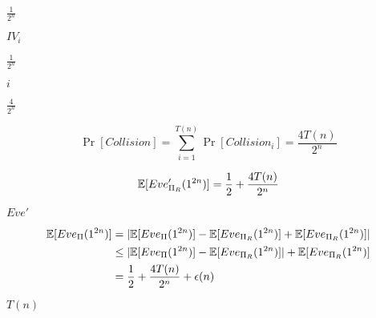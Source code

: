 \documentclass[10pt]{book}
\begin{document}
\begin{mdSnippets}
\begin{mdInlineSnippet}[cc1784df219b5f60fc351c3c720645b1]%
$\frac{1}{2^n}$\end{mdInlineSnippet}%
\begin{mdInlineSnippet}[a672259312fe8429e1475b84f7397226]%
$IV_i$\end{mdInlineSnippet}%
\begin{mdInlineSnippet}[cc1784df219b5f60fc351c3c720645b1]%
$\frac{1}{2^n}$\end{mdInlineSnippet}%
\begin{mdInlineSnippet}[865c0c0b4ab0e063e5caa3387c1a8741]%
$i$\end{mdInlineSnippet}%
\begin{mdInlineSnippet}[b8642ff3d4e361db2d9731400c4863db]%
$\frac{4}{2^n}$\end{mdInlineSnippet}%
\begin{mdDisplaySnippet}[959dd78a45273f77672f45dac7c226de]%
\[%
\Pr[Collision] = \sum_{i=1}^{T(n)} \Pr[Collision_i] = \frac{4T(n)}{2^n}
\]%
\end{mdDisplaySnippet}%
\begin{mdDisplaySnippet}[d7c5245954dfceffbd1f6a652a7e6136]%
\[%
\E[Eve'_{\Pi_R}(1^{2n})] = \frac{1}{2} + \frac{4T(n)}{2^n}
\]%
\end{mdDisplaySnippet}%
\begin{mdInlineSnippet}[0c3570ae86ed9d695d5d1d469a0b8bfa]%
$Eve'$\end{mdInlineSnippet}%
\begin{mdDisplaySnippet}[5722356db87a884897342f10ed1149c9]%
\[%
\begin{aligned}
\E[Eve_{\Pi}(1^{2n})] &= |\E[Eve_{\Pi}(1^{2n})] - \E[Eve_{\Pi_R}(1^{2n})] + \E[Eve_{\Pi_R}(1^{2n})]| \\
&\leq |\E[Eve_{\Pi}(1^{2n})] - \E[Eve_{\Pi_R}(1^{2n})]| + \E[Eve_{\Pi_R}(1^{2n})] \\
&= \frac{1}{2} + \frac{4T(n)}{2^n} +  \epsilon(n)
\end{aligned}
\]%
\end{mdDisplaySnippet}%
\begin{mdInlineSnippet}[514884be093e9ab7909b0d394e7b74d2]%
$T(n)$\end{mdInlineSnippet}%

\end{mdSnippets}
\end{document}
